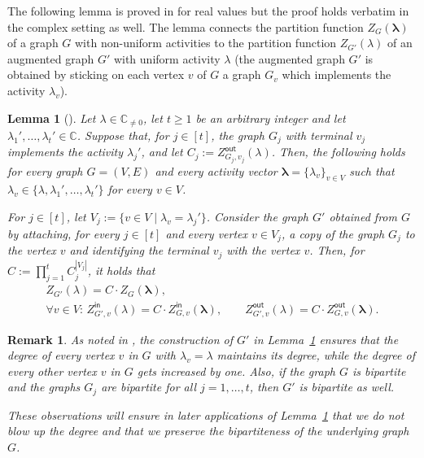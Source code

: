 \documentclass[11pt]{article}
\newtheorem{lemma}[theorem]{Lemma}
\newtheorem{remark}[theorem]{Remark}
\def\Zin{Z^{\mathsf{in}}}
\def\Zout{Z^{\mathsf{out}}}
\def\Complex{\mathbb{C}}
\def\Cnz{\mathbb{C}_{\neq0}}
\def\lambdab{\ensuremath{\boldsymbol{\lambda}}}
\begin{document}
The following lemma is proved in \cite{GGS} for real values but the proof holds verbatim in the complex setting as well. The lemma connects the partition function $Z_G(\lambdab)$ of a graph $G$ with non-uniform activities to the  partition function $Z_{G'}(\lambda)$ of an augmented graph $G'$ with uniform activity $\lambda$ (the augmented graph $G'$ is obtained by sticking on each vertex $v$ of $G$ a graph $G_v$ which implements the activity $\lambda_v$). 
\begin{lemma}[{\cite[Lemma 5]{GGS}}]\label{lem:transf}
Let $\lambda\in \Cnz$, let $t\geq 1$ be an arbitrary integer and let $\lambda_1',\hdots,\lambda_t'\in \Complex$. Suppose that, for $j\in [t]$, the graph $G_j$ with terminal $v_j$ implements the activity $\lambda_j'$, and let  $C_j:=\Zout_{G_j,v_j}(\lambda)$. Then, the following holds for every graph $G=(V,E)$ and every activity vector $\lambdab=\{\lambda_v\}_{v\in V}$ such that $\lambda_v\in\{\lambda,\lambda_1',\hdots,\lambda_t'\}$ for every $v\in V$.


For $j\in[t]$, let $V_j:=\{v\in V\mid \lambda_v=\lambda_j'\}$. Consider the graph $G'$ obtained from $G$ by attaching, for every $j\in [t]$ and every vertex $v\in V_j$, a copy of the graph $G_j$ to the vertex $v$ and identifying the terminal $v_j$ with the vertex $v$. Then, for $C:=\prod^t_{j=1}C_j^{|V_j|}$, it holds that
\begin{gather}
Z_{G'}(\lambda)=C\cdot Z_G(\lambdab),\label{eq:uni}\\
\mbox{$\forall v\in V$: } \Zin_{G',v}(\lambda)=C\cdot \Zin_{G,v}(\lambdab), \qquad \Zout_{G',v}(\lambda)=C\cdot \Zout_{G,v}(\lambdab).\label{eq:uniinout}
\end{gather}
\end{lemma}
\begin{remark}\label{rem:observ}
As noted in \cite[Remark 6]{GGS}, the construction of $G'$ in Lemma~\ref{lem:transf} ensures that  the degree of every vertex $v$ in $G$ with $\lambda_v=\lambda$ maintains its degree, while  the degree of every other vertex $v$ in $G$ gets increased by one.  Also, if the graph $G$ is bipartite and the graphs $G_j$ are bipartite for all $j=1,\hdots,t$, then $G'$ is bipartite as well. 

These observations will ensure in later applications of Lemma~\ref{lem:transf} that we do not blow up the degree and that we preserve the bipartiteness of the underlying graph $G$.
\end{remark}
\end{document}

